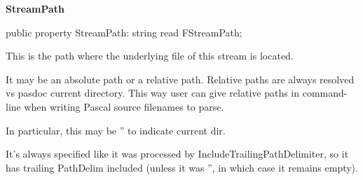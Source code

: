 \documentclass{report}
\newif\ifpdf
\begin{document}
\begin{list}{}
\begin{flushleft}
\ifpdf
\end{flushleft}
\fi


\par  \label{PasDoc_Tokenizer.TTokenizer-StreamPath}
\item[\textbf{StreamPath}\hfill]
\ifpdf
\begin{flushleft}
\fi
\begin{ttfamily}
public property StreamPath: string read FStreamPath;\end{ttfamily}

\ifpdf
\end{flushleft}
\fi


\par This is the path where the underlying file of this stream is located.

It may be an absolute path or a relative path. Relative paths are always resolved vs pasdoc current directory. This way user can give relative paths in command{-}line when writing Pascal source filenames to parse.

In particular, this may be '' to indicate current dir.

It's always specified like it was processed by IncludeTrailingPathDelimiter, so it has trailing PathDelim included (unless it was '', in which case it remains empty).\end{list}
\end{document}

